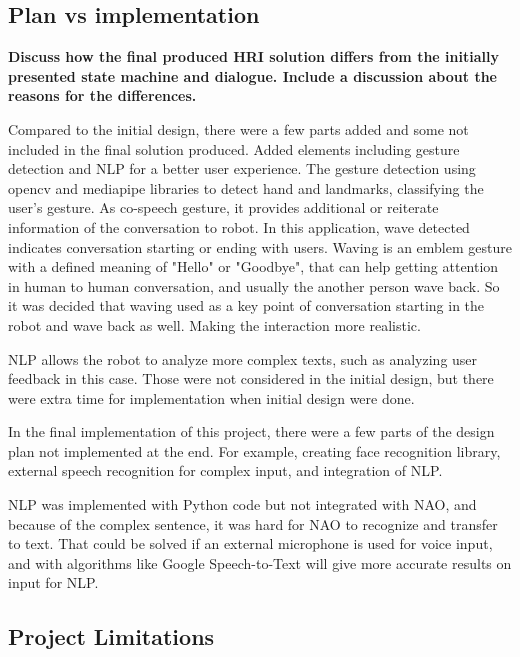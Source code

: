 \documentclass[conference]{IEEEtran}
\begin{document}
\subsection{Plan vs implementation}
\textbf{Discuss how the final produced HRI solution differs from the initially presented state machine and dialogue. Include a discussion about the reasons for the differences.}

Compared to the initial design, there were a few parts added and some not included in the final solution produced. Added elements including gesture detection and NLP for a better user experience. The gesture detection using opencv and mediapipe libraries to detect hand and landmarks, classifying the user's gesture. As co-speech gesture, it provides additional or reiterate information of the conversation to robot. In this application, wave detected indicates conversation starting or ending with users. Waving is an emblem gesture with a defined meaning of "Hello" or "Goodbye", that can help getting attention in human to human conversation, and usually the another person wave back. So it was decided that waving used as a key point of conversation starting in the robot and wave back as well. Making the interaction more realistic.

NLP allows the robot to analyze more complex texts, such as analyzing user feedback in this case. Those were not considered in the initial design, but there were extra time for implementation when initial design were done.

In the final implementation of this project, there were a few parts of the design plan not implemented at the end. For example, creating face recognition library, external speech recognition for complex input, and integration of NLP.


NLP was implemented with Python code but not integrated with NAO, and because of the complex sentence, it was hard for NAO to recognize and transfer to text. That could be solved if an external microphone is used for voice input, and with algorithms like Google Speech-to-Text will give more accurate results on input for NLP. 


\subsection{Project Limitations}
\end{document}
